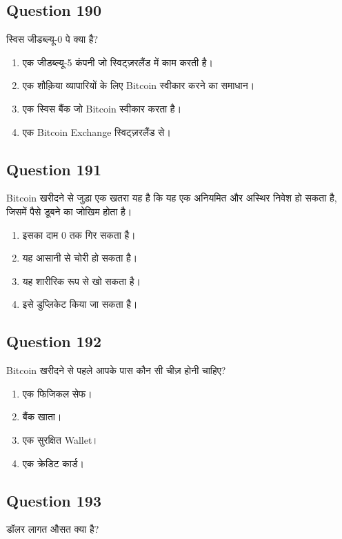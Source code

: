 \documentclass[12pt,a4paper]{article}
\begin{document}
\subsection*{Question 190}
स्विस जीडब्ल्यू-0 पे क्या है?

\begin{enumerate}[label=\Alph*., leftmargin=*]
\item एक जीडब्ल्यू-5 कंपनी जो स्विट्ज़रलैंड में काम करती है।
\item एक शौक़िया व्यापारियों के लिए Bitcoin स्वीकार करने का समाधान।
\item एक स्विस बैंक जो Bitcoin स्वीकार करता है।
\item एक Bitcoin Exchange स्विट्ज़रलैंड से।
\end{enumerate}

\bigskip


\subsection*{Question 191}
Bitcoin खरीदने से जुड़ा एक खतरा यह है कि यह एक अनियमित और अस्थिर निवेश हो सकता है, जिसमें पैसे डूबने का जोखिम होता है।

\begin{enumerate}[label=\Alph*., leftmargin=*]
\item इसका दाम 0 तक गिर सकता है।
\item यह आसानी से चोरी हो सकता है।
\item यह शारीरिक रूप से खो सकता है।
\item इसे डुप्लिकेट किया जा सकता है।
\end{enumerate}

\bigskip


\subsection*{Question 192}
Bitcoin खरीदने से पहले आपके पास कौन सी चीज़ होनी चाहिए?

\begin{enumerate}[label=\Alph*., leftmargin=*]
\item एक फिजिकल सेफ।
\item बैंक खाता।
\item एक सुरक्षित Wallet।
\item एक क्रेडिट कार्ड।
\end{enumerate}

\bigskip


\subsection*{Question 193}
डॉलर लागत औसत क्या है?
\end{document}
